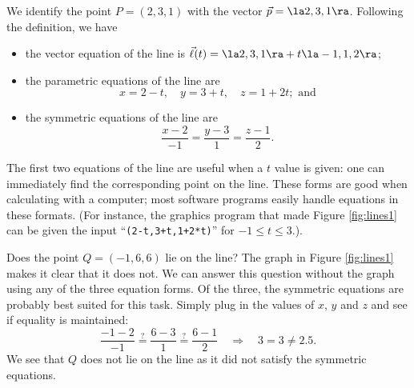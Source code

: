 {We identify the point $P=(2,3,1)$ with the vector $\vec p =\la 2,3,1\ra$. Following the definition, we have
\begin{itemize}
	\item the vector equation of the line is $\vec\ell(t) = \la 2,3,1\ra + t\la -1,1,2\ra$;
	\item	the parametric equations of the line are
	\[
	x = 2-t,\quad y = 3+t,\quad z = 1+2t; \text{ and}
	\]
	\item	the symmetric equations of the line are
	\[
	\frac{x-2}{-1}=\frac{y-3}{1} = \frac{z-1}{2}.
	\]
\end{itemize}

The first two equations of the line are useful when a $t$ value is given: one can immediately find the corresponding point on the line. These forms are good when calculating with a computer; most software programs easily handle equations in these formats. (For instance, the graphics program that made Figure \ref{fig:lines1} can be given the input ``\texttt{(2-t,3+t,1+2*t)}'' for $-1\leq t\leq 3$.).

Does the point $Q = (-1,6,6)$ lie on the line? The graph in Figure \ref{fig:lines1} makes it clear that it does not. We can answer this question without the graph using any of the three equation forms. Of the three, the symmetric equations are probably best suited for this task. Simply plug in the values of $x$, $y$ and $z$ and see if equality is maintained:
\[
 \frac{-1-2}{-1} \stackrel{?}{=} \frac{6-3}{1} \stackrel{?}{=} \frac{6-1}{2} \quad \Rightarrow \quad 3=3\neq2.5.
\]
We see that $Q$ does not lie on the line as it did not satisfy the symmetric equations.
}\\

